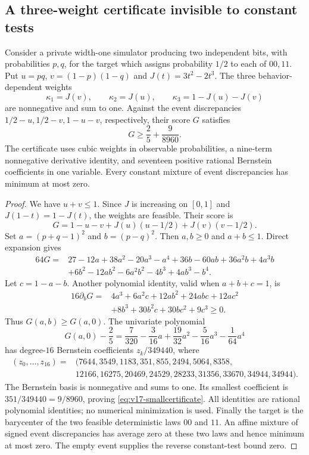 \subsection{A three-weight certificate invisible to constant tests}
\begin{proposition}
\label{prop:v17-smallcertificate}
Consider a private width-one simulator producing two independent bits,
with probabilities $p,q$, for the target which assigns probability
$1/2$ to each of $00,11$. Put $u=pq$, $v=(1-p)(1-q)$ and
$J(t)=3t^2-2t^3$. The three behavior-dependent weights
\[
 \kappa_1=J(v),\qquad \kappa_2=J(u),\qquad
 \kappa_3=1-J(u)-J(v)
\]
are nonnegative and sum to one. Against the event discrepancies
$1/2-u,1/2-v,1-u-v$, respectively, their score $G$ satisfies
\begin{equation}\label{eq:v17-smallcertificate}
 G\ge \frac25+\frac9{8960}.
\end{equation}
The certificate uses cubic weights in observable probabilities,
a nine-term nonnegative derivative identity, and seventeen positive
rational Bernstein coefficients in one variable. Every constant
mixture of event discrepancies has minimum at most zero.
\end{proposition}
\begin{proof}
We have $u+v\le1$. Since $J$ is increasing on $[0,1]$ and
$J(1-t)=1-J(t)$, the weights are feasible. Their score is
\[
 G=1-u-v+J(u)(u-1/2)+J(v)(v-1/2).
\]
Set $a=(p+q-1)^2$ and $b=(p-q)^2$. Then $a,b\ge0$ and
$a+b\le1$. Direct expansion gives
\begin{align*}
64G={}&27-12a+38a^2-20a^3-a^4
 +36b-60ab+36a^2b+4a^3b\\
 &+6b^2-12ab^2-6a^2b^2-4b^3+4ab^3-b^4.
\end{align*}
Let $c=1-a-b$. Another polynomial identity, valid when $a+b+c=1$,
is
\begin{align*}
16\partial_bG={}&4a^3+6a^2c+12ab^2+24abc+12ac^2\\
 &+8b^3+30b^2c+30bc^2+9c^3\ge0.
\end{align*}
Thus $G(a,b)\ge G(a,0)$. The univariate polynomial
\[
 G(a,0)-\frac25=\frac7{320}-\frac3{16}a
                  +\frac{19}{32}a^2-\frac5{16}a^3-\frac1{64}a^4
\]
has degree-$16$ Bernstein coefficients $z_k/349440$, where
\begin{align*}
(z_0,\ldots,z_{16})={}&(7644,3549,1183,351,855,2494,5064,8358,\\
 &12166,16275,20469,24529,28233,31356,33670,34944,34944).
\end{align*}
The Bernstein basis is nonnegative and sums to one. Its smallest
coefficient is $351/349440=9/8960$, proving
\eqref{eq:v17-smallcertificate}. All identities are rational polynomial
identities; no numerical minimization is used.
Finally the target is the barycenter of the two feasible deterministic
laws $00$ and $11$. An affine mixture of signed event discrepancies
has average zero at these two laws and hence minimum at most zero.
The empty event supplies the reverse constant-test bound zero.
\end{proof}

